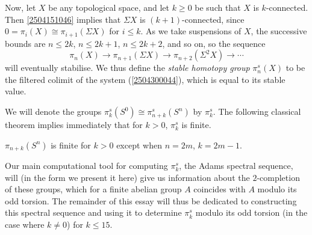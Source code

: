 \documentclass{MetricNotes2023}
\begin{document}
Now, let \(X\) be any topological space, and let \(k\geq 0\) be such that \(X\) is \(k\)-connected. Then \ref{2504151046} implies that \(\Sigma X\) is \((k+1)\)-connected, since \(0=\pi_i(X)\cong \pi_{i+1}(\Sigma X)\) for \(i\leq k\). As we take suspensions of \(X\), the successive bounds are \(n \leq 2k\), \(n \leq 2k+1\), \(n\leq 2k+2\), and so on, so the sequence
\begin{equation}\label{2504300044}
\pi_n(X)\to \pi_{n+1}(\Sigma X) \to \pi_{n+2}(\Sigma^2 X) \to \cdots
\end{equation}
will eventually stabilise. We thus define the \textit{stable homotopy group} \(\pi_n^s(X)\) to be the filtered colimit of the system (\ref{2504300044}), which is equal to its stable value. 

We will denote the groups \(\pi_k^s(S^0)\cong \pi^s_{n+k}(S^n)\) by \(\pi_k^s\). The following classical theorem implies immediately that for \(k>0\), \(\pi_k^s\) is finite.


\begin{theorem}
\(\pi_{n+k}(S^n)\) is finite for \(k>0\) except when \(n=2m\), \(k=2m-1\). 
\end{theorem}

Our main computational tool for computing \(\pi_k^s\), the Adams spectral sequence, will (in the form we present it here) give us information about the \(2\)-completion of these groups, which for a finite abelian group \(A\) coincides with \(A\) modulo its odd torsion. The remainder of this essay will thus be dedicated to constructing this spectral sequence and using it to determine \(\pi_k^s\) modulo its odd torsion (in the case where \(k\neq 0\)) for \(k \leq 15\). 
\end{document}
